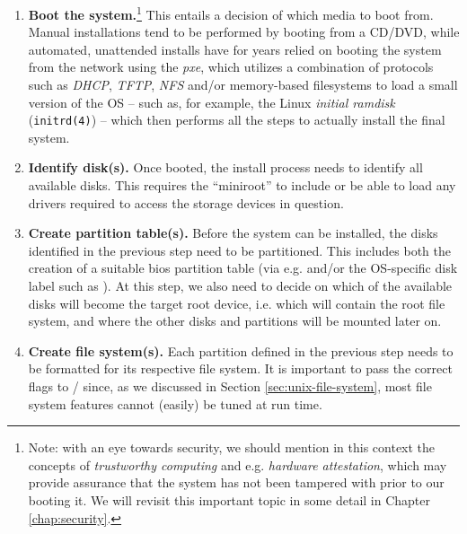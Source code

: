 \begin{enumerate}

	\item {\bf Boot the system.}\footnote{Note:
		with an eye towards security, we
		should mention in this context the
		concepts of {\em trustworthy
		computing} and
		e.g. {\em hardware attestation},
		which may provide assurance that the
		system has not been tampered with
		prior to our booting it.  We will
		revisit this important topic in some
		detail in Chapter
		\ref{chap:security}.}
		This entails a decision of which
		media to boot from.  Manual installations tend to be
		performed by booting from a CD/DVD, while automated,
		unattended installs have for years relied on booting
		the system from the network using the {\em \gls{pxe}},
		which utilizes a combination of protocols such as {\em
		DHCP}, {\em TFTP}, {\em NFS} and/or memory-based
		filesystems to load a small version of the OS -- such as,
		for example, the Linux {\em initial ramdisk} ({\tt initrd(4)}) --
		which then performs all the steps to actually install the final
		system.

	\item {\bf Identify disk(s).}  Once booted, the install
		process needs to identify all available disks.
		This requires the ``miniroot'' to include or be able to load
		any drivers required to access the storage devices in
		question.

	\item {\bf Create partition table(s).}  Before the system can be
		installed, the disks identified in the previous step need
		to be partitioned.  This includes both the creation of a
		suitable \gls{bios} partition table (via e.g. 
		and/or the OS-specific disk label such
		as ).  At this step, we also need to
		decide on which of the available disks will become the
		target root device, i.e. which will contain the root
		file system, and where the other disks and partitions will
		be mounted later on.

	\item {\bf Create file system(s).}  Each partition defined in the
		previous step needs to be formatted for its respective
		file system.  It is important to pass the correct flags to
		/ since, as we
		discussed in Section \ref{sec:unix-file-system}, most file
		system features cannot (easily) be tuned at run time.


\end{enumerate}
